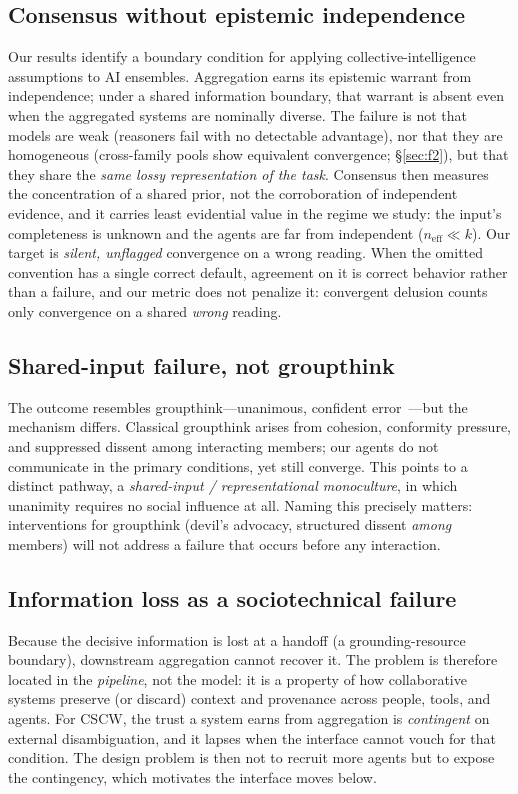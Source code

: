 \documentclass[acmsmall,screen,nonacm]{acmart}
\newcommand{\neff}{\ensuremath{n_{\mathrm{eff}}}}
\begin{document}
\subsection{Consensus without epistemic independence}
Our results identify a boundary condition for applying collective-intelligence assumptions to AI ensembles.
Aggregation earns its epistemic warrant from independence; under a shared information boundary, that warrant
is absent even when the aggregated systems are nominally diverse. The failure is not that models are weak
(reasoners fail with no detectable advantage), nor that they are homogeneous (cross-family pools show
equivalent convergence; \S\ref{sec:f2}), but that
they share the \emph{same lossy representation of the task}. Consensus then measures the concentration of a
shared prior, not the corroboration of independent evidence, and it carries least evidential value in the
regime we study: the input's completeness is unknown and the agents are far from independent
($\neff\!\ll\!k$).
Our target is \emph{silent, unflagged} convergence on a wrong reading. When the omitted convention has a
single correct default, agreement on it is correct behavior rather than a failure, and our metric does not
penalize it: convergent delusion counts only convergence on a shared \emph{wrong} reading.

\subsection{Shared-input failure, not groupthink}
The outcome resembles groupthink---unanimous, confident error~\cite{janis1972}---but the mechanism differs.
Classical groupthink arises from cohesion, conformity pressure, and suppressed dissent among interacting
members; our agents do not communicate in the primary conditions, yet still converge. This points to a
distinct pathway, a \emph{shared-input / representational monoculture}, in which unanimity requires no
social influence at all. Naming this precisely matters: interventions for groupthink (devil's advocacy,
structured dissent \emph{among} members) will not address a failure that occurs before any interaction.

\subsection{Information loss as a sociotechnical failure}
Because the decisive information is lost at a handoff (a grounding-resource boundary), downstream
aggregation cannot recover it. The problem is therefore located in the \emph{pipeline}, not the model: it is
a property of how collaborative systems preserve (or discard) context and provenance across people, tools,
and agents. For CSCW, the trust a system earns from aggregation is \emph{contingent} on external
disambiguation, and it lapses when the interface cannot vouch for that condition. The design problem is then
not to recruit more agents but to expose the contingency, which motivates the interface moves below.
\end{document}
